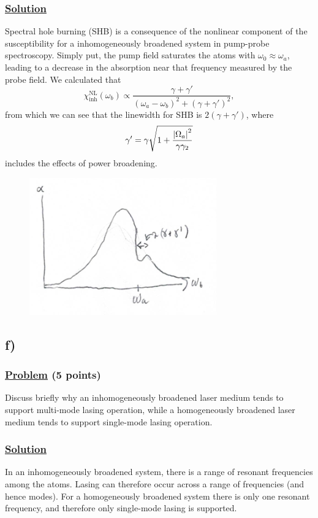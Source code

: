 \documentclass[12pt]{article}
\begin{document}
\subsubsection*{\underline{Solution}}
Spectral hole burning (SHB) is a consequence of the nonlinear component of the susceptibility for a inhomogeneously broadened system in pump-probe spectroscopy. 
Simply put, the pump field saturates the atoms with $\omega_0 \approx \omega_a$, leading to a decrease in the absorption near that frequency measured by the probe field.
We calculated that
\[ \chi_\text{inh}^\text{NL}(\omega_b) \propto \frac{\gamma + \gamma'}{(\omega_a-\omega_b)^2 + (\gamma + \gamma')^2}, \]
from which we can see that the linewidth for SHB is $2(\gamma + \gamma')$, where
\[ \gamma' = \gamma\sqrt{1 + \frac{\abs{\Omega_a}^2}{\gamma\gamma_2}} \]
includes the effects of power broadening.
\begin{figure}[h]
    \centering
    \includegraphics{1e.png}
\end{figure}

\subsection*{f)}
\subsubsection*{\underline{Problem} (5 points)}
Discuss briefly why an inhomogeneously broadened laser medium tends to support multi-mode lasing operation, while a homogeneously broadened laser medium tends to support single-mode lasing operation.

\subsubsection*{\underline{Solution}}
In an inhomogeneously broadened system, there is a range of resonant frequencies among the atoms. Lasing can therefore occur across a range of frequencies (and hence modes).
For a homogeneously broadened system there is only one resonant frequency, and therefore only single-mode lasing is supported.
\end{document}
